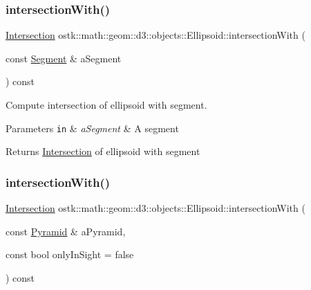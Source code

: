 \subsubsection{\texorpdfstring{intersection\+With()}{intersectionWith()}\hspace{0.1cm}{\footnotesize\ttfamily [3/5]}}
{\footnotesize\ttfamily \hyperlink{classostk_1_1math_1_1geom_1_1d3_1_1_intersection}{Intersection} ostk\+::math\+::geom\+::d3\+::objects\+::\+Ellipsoid\+::intersection\+With (\begin{DoxyParamCaption}\item[{const \hyperlink{classostk_1_1math_1_1geom_1_1d3_1_1objects_1_1_segment}{Segment} \&}]{a\+Segment }\end{DoxyParamCaption}) const}



Compute intersection of ellipsoid with segment. 


\begin{DoxyParams}[1]{Parameters}
\mbox{\tt in}  & {\em a\+Segment} & A segment \\
\hline
\end{DoxyParams}
\begin{DoxyReturn}{Returns}
\hyperlink{classostk_1_1math_1_1geom_1_1d3_1_1_intersection}{Intersection} of ellipsoid with segment 
\end{DoxyReturn}
\mbox{\label{classostk_1_1math_1_1geom_1_1d3_1_1objects_1_1_ellipsoid_aad7841b85e90ebe3ca429772c124033e}} 
\subsubsection{\texorpdfstring{intersection\+With()}{intersectionWith()}\hspace{0.1cm}{\footnotesize\ttfamily [4/5]}}
{\footnotesize\ttfamily \hyperlink{classostk_1_1math_1_1geom_1_1d3_1_1_intersection}{Intersection} ostk\+::math\+::geom\+::d3\+::objects\+::\+Ellipsoid\+::intersection\+With (\begin{DoxyParamCaption}\item[{const \hyperlink{classostk_1_1math_1_1geom_1_1d3_1_1objects_1_1_pyramid}{Pyramid} \&}]{a\+Pyramid,  }\item[{const bool}]{only\+In\+Sight = {\ttfamily false} }\end{DoxyParamCaption}) const}



